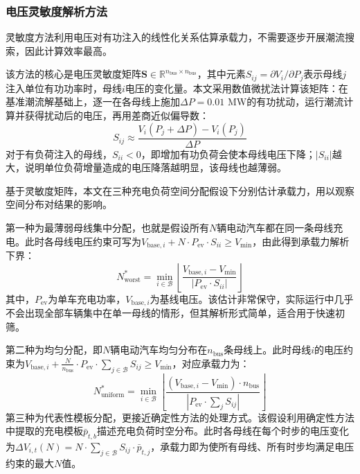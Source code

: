 \documentclass[10pt,a4paper]{article}
\numberwithin{equation}{section}
\numberwithin{table}{section}
\numberwithin{figure}{section}
\begin{document}
    \subsubsection{电压灵敏度解析方法}

    灵敏度方法利用电压对有功注入的线性化关系估算承载力，不需要逐步开展潮流搜索，因此计算效率最高。

    该方法的核心是电压灵敏度矩阵$\mathbf{S} \in \mathbb{R}^{n_{\text{bus}} \times n_{\text{bus}}}$，其中元素$S_{ij} = \partial V_i / \partial P_j$表示母线$j$注入单位有功功率时，母线$i$电压的变化量。本文采用数值微扰法计算该矩阵：在基准潮流解基础上，逐一在各母线上施加$\Delta P = 0.01$ MW的有功扰动，运行潮流计算并获得扰动后的电压，再用差商近似偏导数：
    \begin{equation}
    \label{eq:sensitivity_matrix}
    S_{ij} \approx \frac{V_i(P_j + \Delta P) - V_i(P_j)}{\Delta P}
    \end{equation}
    对于有负荷注入的母线，$S_{ii} < 0$，即增加有功负荷会使本母线电压下降；$|S_{ii}|$越大，说明单位负荷增量造成的电压降落越明显，该母线也越薄弱。

    基于灵敏度矩阵，本文在三种充电负荷空间分配假设下分别估计承载力，用以观察空间分布对结果的影响。

    第一种为最薄弱母线集中分配，也就是假设所有$N$辆电动汽车都在同一条母线充电。此时各母线电压约束可写为$V_{\text{base},i} + N \cdot P_{\text{ev}} \cdot S_{ii} \geq V_{\min}$，由此得到承载力解析下界：
    \begin{equation}
    \label{eq:worst_case_capacity}
    N^*_{\text{worst}} = \min_{i \in \mathcal{B}} \left\lfloor \frac{V_{\text{base},i} - V_{\min}}{|P_{\text{ev}} \cdot S_{ii}|} \right\rfloor
    \end{equation}
    其中，$P_{\text{ev}}$为单车充电功率，$V_{\text{base},i}$为基线电压。该估计非常保守，实际运行中几乎不会出现全部车辆集中在单一母线的情形，但其解析形式简单，适合用于快速初筛。

    第二种为均匀分配，即$N$辆电动汽车均匀分布在$n_{\text{bus}}$条母线上。此时母线$i$的电压约束为$V_{\text{base},i} + \frac{N}{n_{\text{bus}}} \cdot P_{\text{ev}} \cdot \sum_{j \in \mathcal{B}} S_{ij} \geq V_{\min}$，对应承载力为：
    \begin{equation}
    \label{eq:uniform_capacity}
    N^*_{\text{uniform}} = \min_{i \in \mathcal{B}} \left\lfloor \frac{(V_{\text{base},i} - V_{\min}) \cdot n_{\text{bus}}}{|P_{\text{ev}} \cdot \sum_{j} S_{ij}|} \right\rfloor
    \end{equation}
    第三种为代表性模板分配，更接近确定性方法的处理方式。该假设利用确定性方法中提取的充电模板$\bar{p}_{t,b}$描述充电负荷时空分布。此时各母线在每个时步的电压变化为$\Delta V_{i,t}(N) = N \cdot \sum_{j \in \mathcal{B}} S_{ij} \cdot \bar{p}_{t,j}$，承载力即为使所有母线、所有时步均满足电压约束的最大$N$值。
\end{document}
